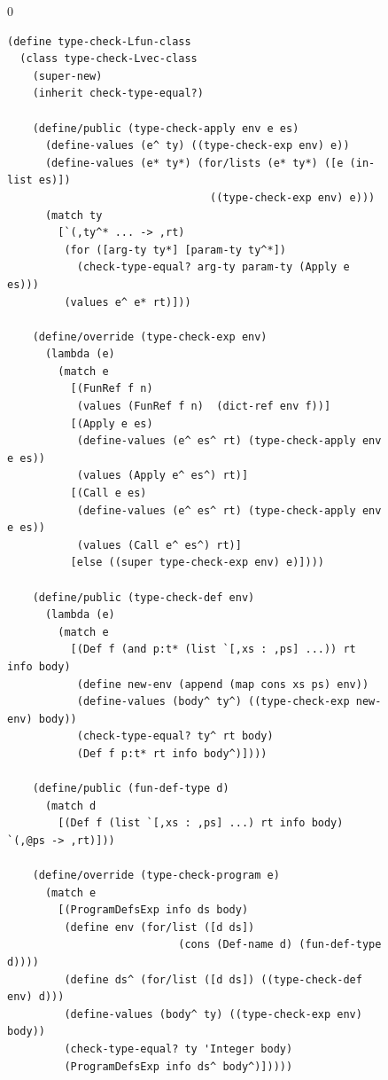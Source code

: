\documentclass[7x10]{TimesAPriori_MIT}%
\def\racketEd{0}
\def\edition{0}
\numberwithin{theorem}{chapter}
\numberwithin{definition}{chapter}
\numberwithin{equation}{chapter}
\begin{document}
\begin{figure}[tp]
  \begin{tcolorbox}[colback=white]
    {\if\edition\racketEd  
\begin{lstlisting}[basicstyle=\ttfamily\footnotesize]
(define type-check-Lfun-class
  (class type-check-Lvec-class
    (super-new)
    (inherit check-type-equal?)

    (define/public (type-check-apply env e es)
      (define-values (e^ ty) ((type-check-exp env) e))
      (define-values (e* ty*) (for/lists (e* ty*) ([e (in-list es)])
                                ((type-check-exp env) e)))
      (match ty
        [`(,ty^* ... -> ,rt)
         (for ([arg-ty ty*] [param-ty ty^*])
           (check-type-equal? arg-ty param-ty (Apply e es)))
         (values e^ e* rt)]))

    (define/override (type-check-exp env)
      (lambda (e)
        (match e
          [(FunRef f n)
           (values (FunRef f n)  (dict-ref env f))]
          [(Apply e es)
           (define-values (e^ es^ rt) (type-check-apply env e es))
           (values (Apply e^ es^) rt)]
          [(Call e es)
           (define-values (e^ es^ rt) (type-check-apply env e es))
           (values (Call e^ es^) rt)]
          [else ((super type-check-exp env) e)])))

    (define/public (type-check-def env)
      (lambda (e)
        (match e
          [(Def f (and p:t* (list `[,xs : ,ps] ...)) rt info body)
           (define new-env (append (map cons xs ps) env))
           (define-values (body^ ty^) ((type-check-exp new-env) body))
           (check-type-equal? ty^ rt body)
           (Def f p:t* rt info body^)])))	 

    (define/public (fun-def-type d)
      (match d
        [(Def f (list `[,xs : ,ps] ...) rt info body)  `(,@ps -> ,rt)]))

    (define/override (type-check-program e)
      (match e
        [(ProgramDefsExp info ds body)
         (define env (for/list ([d ds])
                           (cons (Def-name d) (fun-def-type d))))
         (define ds^ (for/list ([d ds]) ((type-check-def env) d)))
         (define-values (body^ ty) ((type-check-exp env) body))
         (check-type-equal? ty 'Integer body)
         (ProgramDefsExp info ds^ body^)]))))


\end{lstlisting}}
\end{tcolorbox}
\end{figure}
\end{document}
